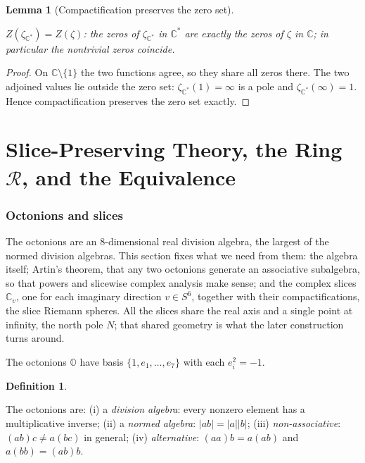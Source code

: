 \documentclass[11pt]{article}
\newcommand{\OO}{\mathbb{O}}
\newcommand{\CC}{\mathbb{C}}
\newcommand{\Cstar}{\CC^{*}}
\newcommand{\zetaC}{\zeta_{\Cstar}}
\providecommand{\lean}[1]{}
\providecommand{\uses}[1]{}
\theoremstyle{plain}
\newtheorem{lemma}[theorem]{Lemma}
\theoremstyle{definition}
\newtheorem{definition}[theorem]{Definition}
\theoremstyle{remark}
\begin{document}
\begin{lemma}[Compactification preserves the zero set]\label{lem:zero-Cstar}
\lean{zetaC_coe_eq_zero_iff, zetaC_zero_iff}
\uses{def:zeta-Cstar}
$Z(\zetaC)=Z(\zeta)$: the zeros of $\zetaC$ in $\Cstar$ are exactly the zeros of $\zeta$
in $\CC$; in particular the nontrivial zeros coincide.
\end{lemma}
\begin{proof}
On $\CC\setminus\{1\}$ the two functions agree, so they share all zeros there. The two
adjoined values lie outside the zero set: $\zetaC(1)=\infty$ is a pole and
$\zetaC(\infty)=1$. Hence compactification preserves the zero set exactly.
\end{proof}

\part{Slice-Preserving Theory, the Ring $\mathcal R$, and the Equivalence}

\section{Octonions and slices}

The octonions are an $8$-dimensional real division algebra, the largest of the normed division
algebras. This section fixes what we need from them: the algebra itself; Artin's theorem, that any
two octonions generate an associative subalgebra, so that powers and slicewise complex analysis
make sense; and the complex slices $\CC_v$, one for each imaginary direction $v\in S^6$, together
with their compactifications, the slice Riemann spheres. All the slices share the real axis and a
single point at infinity, the north pole $N$; that shared geometry is what the later construction
turns around.

The octonions $\OO$ have basis $\{1,e_1,\dots,e_7\}$ with each $e_i^2=-1$.

\begin{definition}\label{def:octonions}
\lean{Octonion, Octonion.normSq_mul, Octonion.alt_left, Octonion.alt_right}
The octonions are: (i) a \emph{division algebra}: every nonzero element has a
multiplicative inverse; (ii) a \emph{normed algebra}: $|ab|=|a||b|$; (iii)
\emph{non-associative}: $(ab)c\neq a(bc)$ in general; (iv) \emph{alternative}:
$(aa)b=a(ab)$ and $a(bb)=(ab)b$.
\end{definition}
\end{document}
